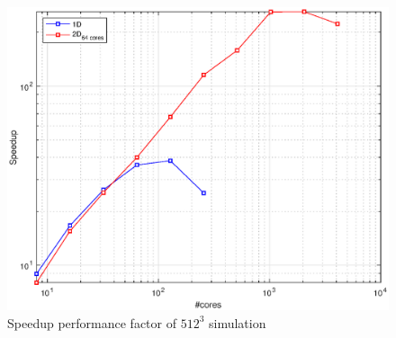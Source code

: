 \begin{figure}
\begin{center}
\includegraphics[scale=0.6]{grafici/5122}
\caption{Speedup performance factor of $512^3$ simulation}
\label{5122}
\end{center}
\end{figure}

